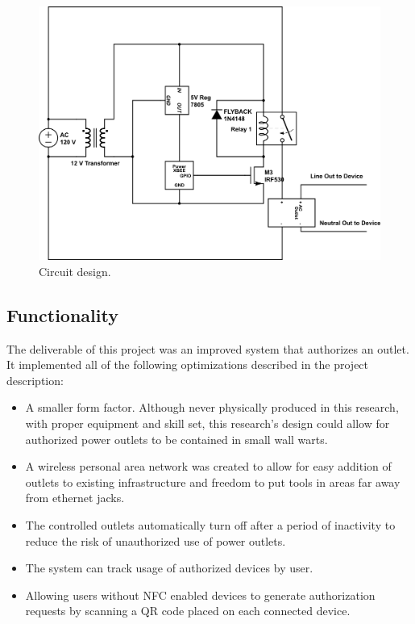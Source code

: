 \documentclass{sigchi}
\begin{document}
\begin{figure}[!h]
\centering
\includegraphics[width=0.9\columnwidth]{circuit}
\caption{Circuit design.}
\label{fig:circuit}
\end{figure}

\subsection {Functionality}
The deliverable of this project was an improved system that authorizes an outlet. It implemented all of the following optimizations described in the project description:
\begin{itemize}
\item A smaller form factor. Although never physically produced in this research, with proper equipment and skill set, this research’s design could allow for authorized power outlets to be contained in small wall warts. 
\item A wireless personal area network was created to allow for easy addition of outlets to existing infrastructure and freedom to put tools in areas far away from ethernet jacks. 
\item The controlled outlets automatically turn off after a period of inactivity to reduce the risk of unauthorized use of power outlets. 
\item The system can track usage of authorized devices by user.
\item Allowing users without NFC enabled devices to generate authorization requests by scanning a QR code placed on each connected device. 
\end{itemize}
\end{document}
